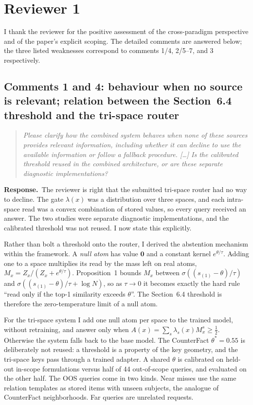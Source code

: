 \documentclass[11pt]{article}
\newenvironment{reviewer}{\par\medskip\noindent\begin{quote}\itshape}{\end{quote}}
\newcommand{\response}{\par\noindent\textbf{Response.}\ }
\begin{document}
\section*{Reviewer 1}

I thank the reviewer for the positive assessment of the cross-paradigm perspective and of the paper's explicit scoping. The detailed comments are answered below; the three listed weaknesses correspond to comments 1/4, 2/5--7, and 3 respectively.

\subsection*{Comments 1 and 4: behaviour when no source is relevant; relation between the Section~6.4 threshold and the tri-space router}

\begin{reviewer}
Please clarify how the combined system behaves when none of these sources provides relevant information, including whether it can decline to use the available information or follow a fallback procedure. [\dots] Is the calibrated threshold reused in the combined architecture, or are these separate diagnostic implementations?
\end{reviewer}

\response The reviewer is right that the submitted tri-space router had no way to decline. The gate $\lambda(x)$ was a distribution over three spaces, and each intra-space read was a convex combination of stored values, so every query received an answer. The two studies were separate diagnostic implementations, and the calibrated threshold was not reused. I now state this explicitly.

Rather than bolt a threshold onto the router, I derived the abstention mechanism within the framework. A \emph{null atom} has value $\mathbf 0$ and a constant kernel $e^{\theta/\tau}$. Adding one to a space multiplies its read by the mass left on real atoms, $M_x=Z_x/(Z_x+e^{\theta/\tau})$. Proposition~1 bounds $M_x$ between $\sigma((s_{(1)}-\theta)/\tau)$ and $\sigma((s_{(1)}-\theta)/\tau+\log N)$, so as $\tau\to0$ it becomes exactly the hard rule ``read only if the top-1 similarity exceeds $\theta$''. The Section~6.4 threshold is therefore the zero-temperature limit of a null atom.

For the tri-space system I add one null atom per space to the trained model, without retraining, and answer only when $A(x)=\sum_s\lambda_s(x)M_x^s\ge\tfrac12$. Otherwise the system falls back to the base model. The CounterFact $\theta^*=0.55$ is deliberately not reused: a threshold is a property of the key geometry, and the tri-space keys pass through a trained adapter. A shared $\theta$ is calibrated on held-out in-scope formulations versus half of 44 out-of-scope queries, and evaluated on the other half. The OOS queries come in two kinds. Near misses use the same relation templates as stored items with unseen subjects, the analogue of CounterFact neighborhoods. Far queries are unrelated requests.
\end{document}
